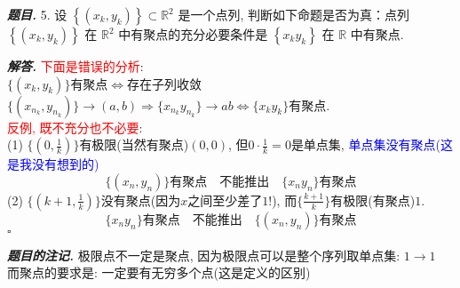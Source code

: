 \documentclass[10pt, a4paper, oneside]{ctexart}
\newenvironment{problem}{\begin{framed}\par\noindent\textbf{\textit{题目. }}}{\end{framed}\par}
\newenvironment{solution}{%
  \par\noindent\textbf{\textit{解答. }}\ignorespaces
}{%
  \hfill\ensuremath{\square}\par %
}
\newenvironment{note}{\par\noindent\textbf{\textit{题目的注记. }}\ignorespaces}{\par}
\begin{document}
\begin{problem}
5. 设 $\left\{\left(x_k, y_k\right)\right\} \subset \mathbb{R}^2$ 是一个点列, 判断如下命题是否为真：点列 $\left\{\left(x_k, y_k\right)\right\}$ 在 $\mathbb{R}^2$ 中有聚点的充分必要条件是 $\left\{x_k y_k\right\}$ 在 $\mathbb{R}$ 中有聚点.
\end{problem}
\begin{solution}\textcolor{red}{下面是错误的分析}: \\$\{(x_k,y_k)\}$有聚点$\iff$存在子列收敛$\{(x_{n_k},y_{n_k})\}\to (a,b)\Rightarrow \{x_{n_k}y_{n_k}\}\to ab \iff \{x_ky_k\}$有聚点.\\
\textcolor{red}{反例, 既不充分也不必要}: \\
(1) $\{(0,\frac{1}{k})\}$有极限(当然有聚点)$(0,0)$, 但$0\cdot \frac{1}{k}=0$是单点集, \textcolor{blue}{单点集没有聚点(这是我没有想到的)}
$$\{(x_n,y_n)\}\text{有聚点}\quad \text{不能推出}\quad \{x_ny_n\}\text{有聚点}$$
(2) $\{(k+1, \frac{1}{k})\}$没有聚点(因为$x$之间至少差了$1$!), 而$\{\frac{k+1}{k}\}$有极限(有聚点)$1$.
$$\{x_ny_n\}\text{有聚点}\quad \text{不能推出}\quad \{(x_n,y_n)\}\text{有聚点}$$
\end{solution}
\begin{note}
    极限点不一定是聚点, 因为极限点可以是整个序列取单点集: $1\to 1$\\
    而聚点的要求是: 一定要有无穷多个点(这是定义的区别)
\end{note}
\end{document}
